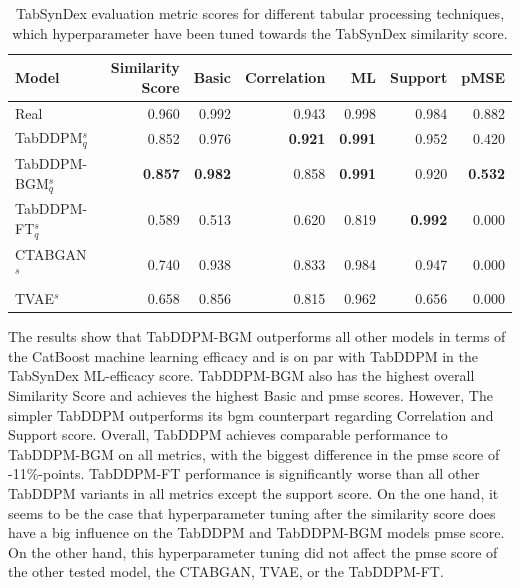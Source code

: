 \begin{table}[h]
	\centering
	\begin{tabular}{lrrrrrr}
		\toprule
		\textbf{Model}        & \textbf{Similarity Score} & \textbf{Basic} & \textbf{Correlation} & \textbf{ML}    & \textbf{Support} & \textbf{pMSE}  \\
		\midrule
		Real                  & 0.960                     & 0.992          & 0.943                & 0.998          & 0.984            & 0.882          \\
		TabDDPM$^{s}_{q}$     & 0.852                     & 0.976          & \textbf{0.921}       & \textbf{0.991} & 0.952            & 0.420          \\
		TabDDPM-BGM$^{s}_{q}$ & \textbf{0.857}            & \textbf{0.982} & 0.858                & \textbf{0.991} & 0.920            & \textbf{0.532} \\
		TabDDPM-FT$^{s}_{q}$  & 0.589                     & 0.513          & 0.620                & 0.819          & \textbf{0.992}   & 0.000          \\
		CTABGAN$^{s}$         & 0.740                     & 0.938          & 0.833                & 0.984          & 0.947            & 0.000          \\
		TVAE$^{s}$            & 0.658                     & 0.856          & 0.815                & 0.962          & 0.656            & 0.000          \\
		\bottomrule
	\end{tabular}
	\caption[Experiment 2 TabSynDex]{TabSynDex evaluation metric scores for different tabular processing techniques, which hyperparameter have been tuned towards the TabSynDex similarity score.}
	\label{tab:exp2-sim}
\end{table}

The results show that TabDDPM-BGM outperforms all other models in terms of the CatBoost machine learning efficacy and is on par with TabDDPM in the TabSynDex ML-efficacy score.
TabDDPM-BGM also has the highest overall Similarity Score and achieves the highest Basic and \gls{pmse} scores.
However, The simpler TabDDPM outperforms its \gls{bgm} counterpart regarding Correlation and Support score.
Overall, TabDDPM achieves comparable performance to TabDDPM-BGM on all metrics, with the biggest difference in the \gls{pmse} score of -11\%-points.
TabDDPM-FT performance is significantly worse than all other TabDDPM variants in all metrics except the support score.
On the one hand, it seems to be the case that hyperparameter tuning after the similarity score does have a big influence on the TabDDPM and TabDDPM-BGM models \gls{pmse} score.
On the other hand, this hyperparameter tuning did not affect the \gls{pmse} score of the other tested model, the CTABGAN, TVAE, or the TabDDPM-FT.

